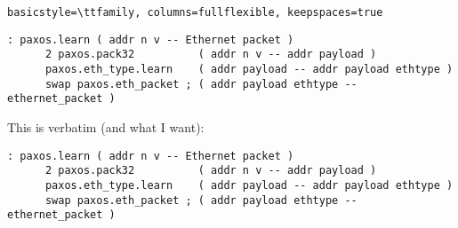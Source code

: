\documentclass[a4paper]{report}
\begin{document}
\lstset{
  basicstyle=\ttfamily,
  columns=fullflexible,
  keepspaces=true,
}

\verb|basicstyle=\ttfamily, columns=fullflexible, keepspaces=true|
\begin{lstlisting}
: paxos.learn ( addr n v -- Ethernet packet )
      2 paxos.pack32          ( addr n v -- addr payload )
      paxos.eth_type.learn    ( addr payload -- addr payload ethtype )
      swap paxos.eth_packet ; ( addr payload ethtype -- ethernet_packet )
\end{lstlisting}

This is verbatim (and what I want):
\begin{verbatim}
: paxos.learn ( addr n v -- Ethernet packet )
      2 paxos.pack32          ( addr n v -- addr payload )
      paxos.eth_type.learn    ( addr payload -- addr payload ethtype )
      swap paxos.eth_packet ; ( addr payload ethtype -- ethernet_packet )
\end{verbatim}
\end{document}
